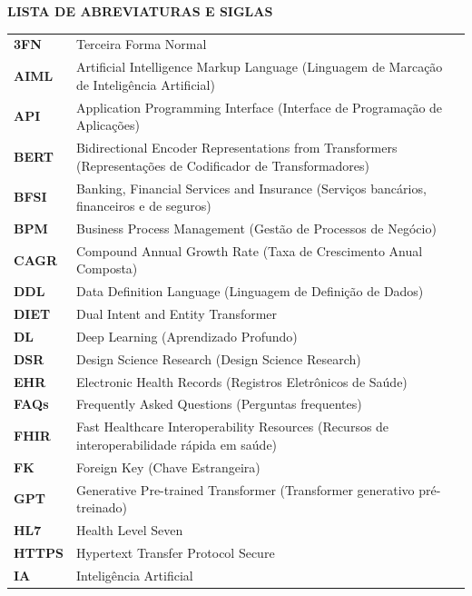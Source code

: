 \documentclass[12pt,a4paper]{extarticle}
\begin{document}
\newpage
\setcounter{page}{1}
\begin{center}
    \textbf{LISTA DE ABREVIATURAS E SIGLAS}
\end{center}
\vspace{1cm}

\begin{xltabular}{\textwidth}{@{}p{1.6cm}Y@{}}
\textbf{3FN} & Terceira Forma Normal \\
\textbf{AIML} & Artificial Intelligence Markup Language (Linguagem de Marcação de Inteligência Artificial) \\
\textbf{API} & Application Programming Interface (Interface de Programação de Aplicações) \\
\textbf{BERT} & Bidirectional Encoder Representations from Transformers (Representações de Codificador de Transformadores) \\
\textbf{BFSI} & Banking, Financial Services and Insurance (Serviços bancários, financeiros e de seguros) \\
\textbf{BPM} & Business Process Management (Gestão de Processos de Negócio) \\
\textbf{CAGR} & Compound Annual Growth Rate (Taxa de Crescimento Anual Composta) \\
\textbf{DDL} & Data Definition Language (Linguagem de Definição de Dados) \\
\textbf{DIET} & Dual Intent and Entity Transformer \\
\textbf{DL} & Deep Learning (Aprendizado Profundo) \\
\textbf{DSR} & Design Science Research (Design Science Research) \\
\textbf{EHR} & Electronic Health Records (Registros Eletrônicos de Saúde) \\
\textbf{FAQs} & Frequently Asked Questions (Perguntas frequentes) \\
\textbf{FHIR} & Fast Healthcare Interoperability Resources (Recursos de interoperabilidade rápida em saúde) \\
\textbf{FK} & Foreign Key (Chave Estrangeira) \\
\textbf{GPT} & Generative Pre-trained Transformer (Transformer generativo pré-treinado) \\
\textbf{HL7} & Health Level Seven \\
\textbf{HTTPS} & Hypertext Transfer Protocol Secure \\
\textbf{IA} & Inteligência Artificial \\

\end{xltabular}
\end{document}
